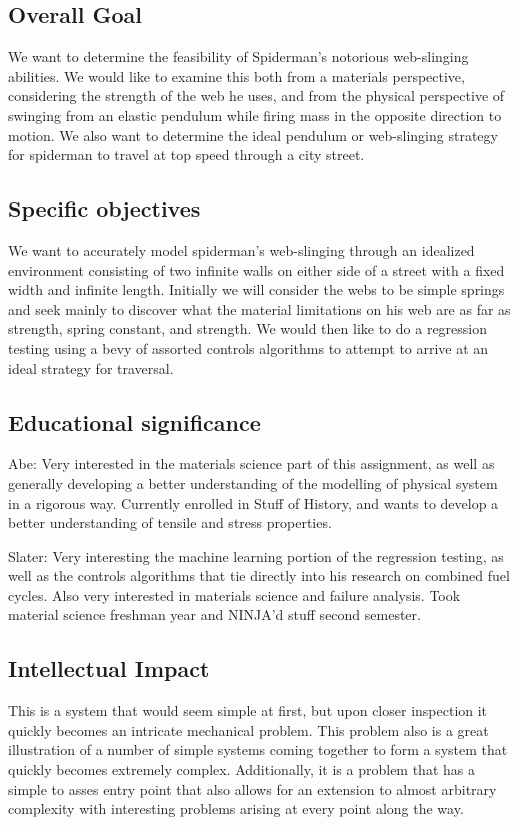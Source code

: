 \subsection{Overall Goal}
We want to determine the feasibility of Spiderman's notorious web-slinging abilities. We would like to examine this both from a materials perspective, considering the strength of the web he uses, and from the physical perspective of swinging from an elastic pendulum while firing mass in the opposite direction to motion. We also want to determine the ideal pendulum or web-slinging strategy for spiderman to travel at top speed through a city street.

\subsection{Specific objectives}
We want to accurately model spiderman's web-slinging through an idealized environment consisting of two infinite walls on either side of a street with a fixed width and infinite length. Initially we will consider the webs to be simple springs and seek mainly to discover what the material limitations on his web are as far as strength, spring constant, and strength. We would then like to do a regression testing using a bevy of assorted controls algorithms to attempt to arrive at an ideal strategy for traversal.

\subsection{Educational significance}
Abe: Very interested in the materials science part of this assignment, as well as generally developing a better understanding of the modelling of physical system in a rigorous way. Currently enrolled in Stuff of History, and wants to develop a better understanding of tensile and stress properties.

Slater: Very interesting the machine learning portion of the regression testing, as well as the controls algorithms that tie directly into his research on combined fuel cycles. Also very interested in materials science and failure analysis. Took material science freshman year and NINJA'd stuff second semester.

\subsection{Intellectual Impact}
This is a system that would seem simple at first, but upon closer inspection it quickly becomes an intricate mechanical problem. This problem also is a great illustration of a number of simple systems coming together to form a system that quickly becomes extremely complex. Additionally, it is a problem that has a simple to asses entry point that also allows for an extension to almost arbitrary complexity with interesting problems arising at every point along the way.

